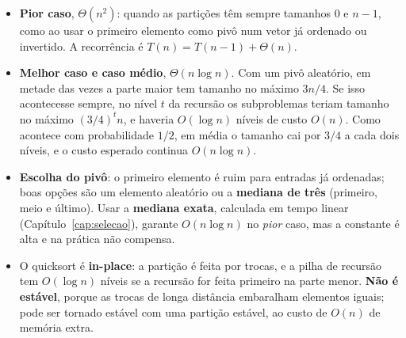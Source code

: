 \begin{itemize}
  \item \textbf{Pior caso}, $\Theta(n^2)$: quando as partições têm sempre tamanhos $0$ e $n-1$, como ao usar o primeiro elemento como pivô num vetor já ordenado ou invertido. A recorrência é $T(n)=T(n-1)+\Theta(n)$.
  \item \textbf{Melhor caso e caso médio}, $\Theta(n\log n)$. Com um pivô aleatório, em metade das vezes a parte maior tem tamanho no máximo $3n/4$. Se isso acontecesse sempre, no nível $t$ da recursão os subproblemas teriam tamanho no máximo $(3/4)^tn$, e haveria $O(\log n)$ níveis de custo $O(n)$. Como acontece com probabilidade $1/2$, em média o tamanho cai por $3/4$ a cada dois níveis, e o custo esperado continua $O(n\log n)$.
  \item \textbf{Escolha do pivô}: o primeiro elemento é ruim para entradas já ordenadas; boas opções são um elemento aleatório ou a \textbf{mediana de três} (primeiro, meio e último). Usar a \textbf{mediana exata}, calculada em tempo linear (Capítulo~\ref{cap:selecao}), garante $O(n\log n)$ no \emph{pior} caso, mas a constante é alta e na prática não compensa.
  \item O quicksort é \textbf{in-place}: a partição é feita por trocas, e a pilha de recursão tem $O(\log n)$ níveis se a recursão for feita primeiro na parte menor. \textbf{Não é estável}, porque as trocas de longa distância embaralham elementos iguais; pode ser tornado estável com uma partição estável, ao custo de $O(n)$ de memória extra.
\end{itemize}

\begin{figura}
\end{figura}


